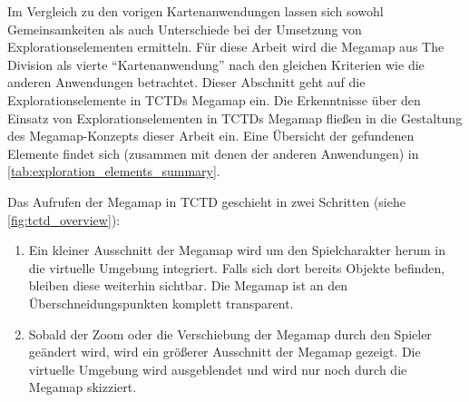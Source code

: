 Im Vergleich zu den vorigen Kartenanwendungen lassen sich sowohl Gemeinsamkeiten als auch Unterschiede bei der Umsetzung von Explorationselementen ermitteln.
Für diese Arbeit wird die Megamap aus The Division als vierte \enquote{Kartenanwendung} nach den gleichen Kriterien wie die anderen Anwendungen betrachtet.
Dieser Abschnitt geht auf die Explorationselemente in TCTDs Megamap ein.
Die Erkenntnisse über den Einsatz von Explorationselementen in TCTDs Megamap fließen in die Gestaltung des Megamap-Konzepts dieser Arbeit ein.
Eine Übersicht der gefundenen Elemente findet sich (zusammen mit denen der anderen Anwendungen) in \autoref{tab:exploration_elements_summary}.

Das Aufrufen der Megamap in TCTD geschieht in zwei Schritten (siehe \autoref{fig:tctd_overview}):
\begin{enumerate}
    \item Ein kleiner Ausschnitt der Megamap wird um den Spielcharakter herum in die virtuelle Umgebung integriert.
    Falls sich dort bereits Objekte befinden, bleiben diese weiterhin sichtbar.
    Die Megamap ist an den Überschneidungspunkten komplett transparent.
    \item Sobald der Zoom oder die Verschiebung der Megamap durch den Spieler geändert wird, wird ein größerer Ausschnitt der Megamap gezeigt.
    Die virtuelle Umgebung wird ausgeblendet und wird nur noch durch die Megamap skizziert.
\end{enumerate}
